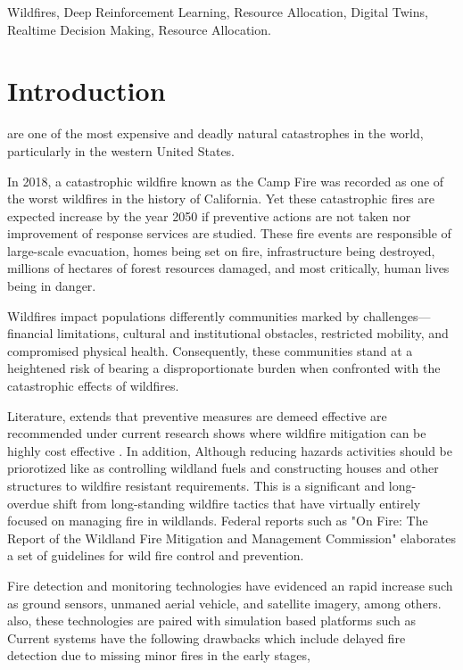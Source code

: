 \documentclass[lettersize,journal]{IEEEtran}
\begin{document}
\begin{IEEEkeywords}
Wildfires, Deep Reinforcement Learning, Resource Allocation, Digital Twins, Realtime Decision Making, Resource Allocation.
\end{IEEEkeywords}

\section{Introduction}\label{introduction}
 are one of the most expensive and deadly natural catastrophes in the world, particularly in the western United States. 

In 2018, a catastrophic wildfire known as the Camp Fire was recorded as one of the worst wildfires in the history of California. 
Yet these catastrophic fires are expected increase by the year 2050 \cite{nations_as_nodate} if preventive actions are not taken nor improvement of response services are studied. These fire events are responsible of large-scale evacuation, homes being set on fire, 
infrastructure being destroyed, millions of hectares of forest resources damaged, and most critically, human lives being in danger.



Wildfires impact populations differently communities marked by challenges—financial limitations, cultural and institutional obstacles, restricted mobility, and compromised physical health. 
Consequently, these communities stand at a heightened risk of bearing a disproportionate burden when confronted with the catastrophic effects of wildfires. 



Literature, extends that preventive measures are demeed effective are recommended under current
research shows where wildfire mitigation can be highly cost effective
\cite{Patrick Baylis} . In addition, 
Although reducing hazards activities should be priorotized like as controlling wildland fuels and constructing houses and other structures to wildfire resistant requirements. 
This is a significant and long-overdue shift from long-standing wildfire tactics that have virtually entirely focused on managing fire in wildlands.
Federal reports such as "On Fire: The Report of the Wildland Fire Mitigation and Management Commission" elaborates a set of guidelines for wild fire control and prevention.

Fire detection and monitoring technologies have evidenced an rapid increase such as ground sensors, unmaned aerial vehicle, and satellite imagery, among others.
also, these technologies are paired with simulation based platforms such as 
Current systems have the following drawbacks which include delayed fire detection due to missing minor fires in the early stages, 
\end{document}
